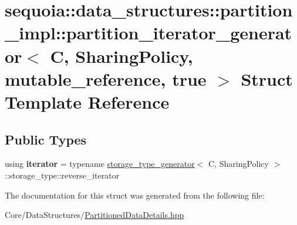 \hypertarget{structsequoia_1_1data__structures_1_1partition__impl_1_1partition__iterator__generator_3_01_c_003c40430bc8dc92649034e37366af5a8e}{}\section{sequoia\+::data\+\_\+structures\+::partition\+\_\+impl\+::partition\+\_\+iterator\+\_\+generator$<$ C, Sharing\+Policy, mutable\+\_\+reference, true $>$ Struct Template Reference}
\label{structsequoia_1_1data__structures_1_1partition__impl_1_1partition__iterator__generator_3_01_c_003c40430bc8dc92649034e37366af5a8e}
\subsection*{Public Types}
\begin{DoxyCompactItemize}
\item 
\mbox{\label{structsequoia_1_1data__structures_1_1partition__impl_1_1partition__iterator__generator_3_01_c_003c40430bc8dc92649034e37366af5a8e_aabd269f53962856b1c1c5b7a2db6a0ad}} 
using {\bfseries iterator} = typename \mbox{\hyperlink{structsequoia_1_1data__structures_1_1partition__impl_1_1storage__type__generator}{storage\+\_\+type\+\_\+generator}}$<$ C, Sharing\+Policy $>$\+::storage\+\_\+type\+::reverse\+\_\+iterator
\end{DoxyCompactItemize}


The documentation for this struct was generated from the following file\+:\begin{DoxyCompactItemize}
\item 
Core/\+Data\+Structures/\mbox{\hyperlink{_partitioned_data_details_8hpp}{Partitioned\+Data\+Details.\+hpp}}\end{DoxyCompactItemize}
